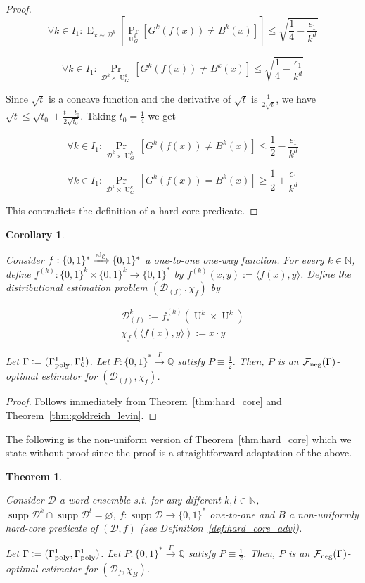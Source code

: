 \documentclass[11pt]{article}
\numberwithin{equation}{section}
\theoremstyle{definition}
\theoremstyle{plain}
\newtheorem{theorem}{Theorem}[section]
\newtheorem{corollary}{Corollary}[section]
\newcommand{\Bool}{\{0,1\}}
\newcommand{\Words}{{\Bool^*}}
\newcommand{\WordsLen}[1]{{\Bool^{#1}}}
\DeclareMathOperator{\Supp}{supp}
\DeclareMathOperator{\Prb}{Pr}
\DeclareMathOperator{\E}{E}
\DeclareMathOperator{\Un}{U}
\newcommand{\Nats}{\mathbb{N}}
\newcommand{\Rats}{\mathbb{Q}}
\newcommand{\Chev}[1]{\langle #1 \rangle}
\newcommand{\Dist}{\mathcal{D}}
\newcommand{\Fall}{\mathcal{F}}
\newcommand{\GammaPoly}{\Gamma_{\textnormal{poly}}}
\newcommand{\Alg}{\xrightarrow{\textnormal{alg}}}
\newcommand{\Scheme}{\xrightarrow{\Gamma}}
\begin{document}
\begin{proof}
$$ \forall k \in I_1: \E_{x \sim \Dist^k}[\Prb_{\Un_G^k}[G^k(f(x)) \ne B^k(x)]] \leq \sqrt{\frac{1}{4} - \frac{\epsilon_1}{k^d}} $$

$$ \forall k \in I_1: \Prb_{\Dist^{k} \times \Un_G^k}[G^k(f(x)) \ne B^k(x)] \leq \sqrt{\frac{1}{4} - \frac{\epsilon_1}{k^d}} $$

Since $\sqrt{t}$ is a concave function and the derivative of $\sqrt{t}$ is $\frac{1}{2\sqrt{t}}$, we have $\sqrt{t} \leq \sqrt{t_0} + \frac{t-t_0}{2\sqrt{t_0}}$. Taking ${t_0}=\frac{1}{4}$ we get

$$ \forall k \in I_1: \Prb_{\Dist^{k} \times \Un_G^k}[G^k(f(x)) \ne B^k(x)] \leq \frac{1}{2}-\frac{\epsilon_1}{k^d}$$

$$ \forall k \in I_1: \Prb_{\Dist^{k} \times \Un_G^k}[G^k(f(x)) = B^k(x)] \geq \frac{1}{2}+\frac{\epsilon_1}{k^d}$$

This contradicts the definition of a hard-core predicate.
\end{proof}

\begin{corollary}
\label{crl:one_way}

Consider $f: \Words \Alg \Words$ a one-to-one one-way function. For every ${k \in \Nats}$, define $f^{(k)}: \WordsLen{k} \times \WordsLen{k} \rightarrow \Words$ by ${f^{(k)}(x,y):=\Chev{f(x),y}}$. Define the distributional estimation problem $(\Dist_{(f)}, \chi_f)$ by 

\begin{align*}
\Dist_{(f)}^k:=f_*^{(k)}(\Un^k \times \Un^k) \\
\chi_f(\Chev{f(x),y}):=x \cdot y
\end{align*}

Let $\Gamma:=(\GammaPoly^1,\Gamma_0^1)$. Let $P: \Words \Scheme \Rats$ satisfy $P \equiv \frac{1}{2}$. Then, $P$ is an $\Fall_{\textnormal{neg}}(\Gamma)$-optimal estimator for $(\Dist_{(f)}, \chi_f)$.

\end{corollary}

\begin{proof}

Follows immediately from Theorem~\ref{thm:hard_core} and Theorem~\ref{thm:goldreich_levin}.
\end{proof}

The following is the non-uniform version of Theorem~\ref{thm:hard_core} which we state without proof since the proof is a straightforward adaptation of the above.

\begin{theorem}
\label{thm:hard_core_circ}

Consider $\Dist$ a word ensemble s.t. for any different $k,l \in \Nats$,\\ $\Supp \Dist^k \cap \Supp \Dist^l = \varnothing$, $f: \Supp \Dist \rightarrow \Words$ one-to-one and $B$ a non-uniformly hard-core predicate of $(\Dist,f)$ (see Definition~\ref{def:hard_core_adv}). 

Let $\Gamma:=(\GammaPoly^1,\GammaPoly^1)$. Let $P: \Words \Scheme \Rats$ satisfy $P \equiv \frac{1}{2}$. Then, $P$ is an $\Fall_{\textnormal{neg}}(\Gamma)$-optimal estimator for $(\Dist_f, \chi_B)$.

\end{theorem}
\end{document}
